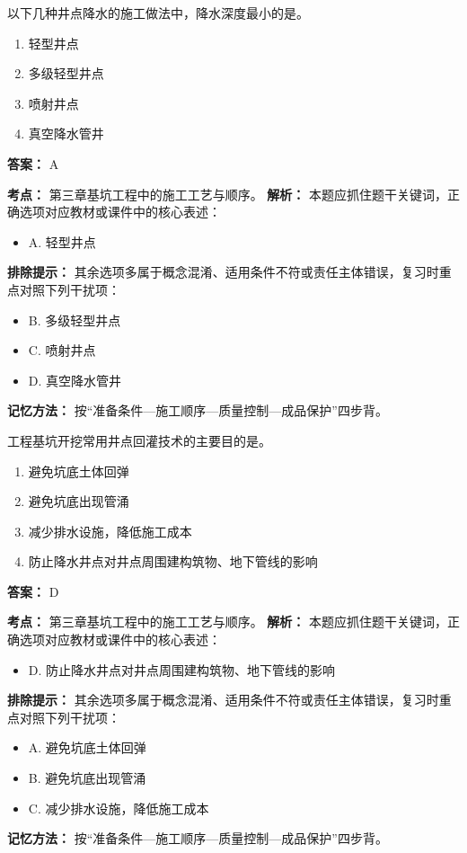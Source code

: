 \documentclass[UTF8,fontset=fandol,11pt]{ctexart}
\begin{document}
\begin{quizbox}[title={第 17 题}]
以下几种井点降水的施工做法中，降水深度最小的是。\\
\begin{enumerate}[label=\Alph*.]
\item 轻型井点
\item 多级轻型井点
\item 喷射井点
\item 真空降水管井
\end{enumerate}
\textbf{答案：} A
\vspace{0.25em}
\begin{answerbox}[title={考点解析}]
\textbf{考点：} 第三章基坑工程中的施工工艺与顺序。
\textbf{解析：} 本题应抓住题干关键词，正确选项对应教材或课件中的核心表述：
\begin{itemize}
\item A. 轻型井点
\end{itemize}
\textbf{排除提示：} 其余选项多属于概念混淆、适用条件不符或责任主体错误，复习时重点对照下列干扰项：
\begin{itemize}
\item B. 多级轻型井点
\item C. 喷射井点
\item D. 真空降水管井
\end{itemize}
\textbf{记忆方法：} 按“准备条件—施工顺序—质量控制—成品保护”四步背。
\end{answerbox}
\end{quizbox}

\begin{quizbox}[title={第 18 题}]
工程基坑开挖常用井点回灌技术的主要目的是。\\
\begin{enumerate}[label=\Alph*.]
\item 避免坑底土体回弹
\item 避免坑底出现管涌
\item 减少排水设施，降低施工成本
\item 防止降水井点对井点周围建构筑物、地下管线的影响
\end{enumerate}
\textbf{答案：} D
\vspace{0.25em}
\begin{answerbox}[title={考点解析}]
\textbf{考点：} 第三章基坑工程中的施工工艺与顺序。
\textbf{解析：} 本题应抓住题干关键词，正确选项对应教材或课件中的核心表述：
\begin{itemize}
\item D. 防止降水井点对井点周围建构筑物、地下管线的影响
\end{itemize}
\textbf{排除提示：} 其余选项多属于概念混淆、适用条件不符或责任主体错误，复习时重点对照下列干扰项：
\begin{itemize}
\item A. 避免坑底土体回弹
\item B. 避免坑底出现管涌
\item C. 减少排水设施，降低施工成本
\end{itemize}
\textbf{记忆方法：} 按“准备条件—施工顺序—质量控制—成品保护”四步背。
\end{answerbox}
\end{quizbox}
\end{document}
